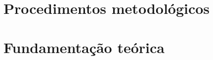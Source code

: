 \documentclass[
	11pt,				%
	openright,			%
	oneside,			%
	a4paper,			%
	english,			%
	french,				%
	spanish,			%
	brazil,				%
	]{abntex2}
\begin{document}
\chapter{Procedimentos metodológicos}


\chapter{Fundamentação teórica}

%
%
%
%



% 

%


\postextual




%
%



\end{document}
